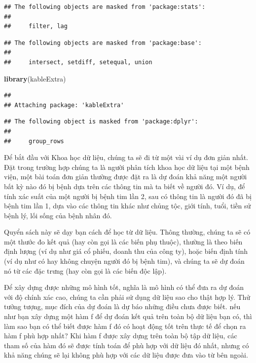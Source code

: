 \documentclass[
  12pt,
]{krantz}
\newenvironment{Shaded}{\begin{snugshade}}{\end{snugshade}}
\newcommand{\FunctionTok}[1]{\textcolor[rgb]{0.13,0.29,0.53}{\textbf{#1}}}
\newcommand{\NormalTok}[1]{#1}
\begin{document}
\begin{verbatim}
## The following objects are masked from 'package:stats':
## 
##     filter, lag
\end{verbatim}

\begin{verbatim}
## The following objects are masked from 'package:base':
## 
##     intersect, setdiff, setequal, union
\end{verbatim}

\begin{Shaded}
\begin{Highlighting}[]
\FunctionTok{library}\NormalTok{(kableExtra)}
\end{Highlighting}
\end{Shaded}

\begin{verbatim}
## 
## Attaching package: 'kableExtra'
\end{verbatim}

\begin{verbatim}
## The following object is masked from 'package:dplyr':
## 
##     group_rows
\end{verbatim}

Để bắt đầu với Khoa học dữ liệu, chúng ta sẽ đi từ một vài ví dụ đơn giản nhất. Đặt trong trường hợp chúng ta là người phân tích khoa học dữ liệu tại một bệnh viện, một bài toán đơn giản thường được đặt ra là dự đoán khả năng một người bất kỳ nào đó bị bệnh dựa trên các thông tin mà ta biết về người đó. Ví dụ, để tính xác suất của một người bị bệnh tim lần 2, sau có thông tin là người đó đã bị bệnh tim lần 1, dựa vào các thông tin khác như chủng tộc, giới tính, tuổi, tiền sử bệnh lý, lối sống của bệnh nhân đó.

Quyển sách này sẽ dạy bạn cách để học từ dữ liệu. Thông thường, chúng ta sẽ có một thước đo kết quả (hay còn gọi là các biến phụ thuộc), thường là theo biến định lượng (ví dụ như giá cổ phiếu, doanh thu của công ty), hoặc biến định tính (ví dụ như có hay không chuyện người đó bị bệnh tim), và chúng ta sẽ dự đoán nó từ các đặc trưng (hay còn gọi là các biến độc lập).

Để xây dựng được những mô hình tốt, nghĩa là mô hình có thể đưa ra dự đoán với độ chính xác cao, chúng ta cần phải sử dụng dữ liệu sao cho thật hợp lý. Thử tưởng tượng, mục đích của dự đoán là dự báo những điều chưa được biết. nếu như bạn xây dựng một hàm f để dự đoán kết quả trên toàn bộ dữ liệu bạn có, thì làm sao bạn có thể biết được hàm f đó có hoạt động tốt trên thực tế để chọn ra hàm f phù hợp nhất? Khi hàm f được xây dựng trên toàn bộ tập dữ liệu, các tham số của hàm đó sẽ được tính toán để phù hợp với dữ liệu đó nhất, nhưng có khả năng chúng sẽ lại không phù hợp với các dữ liệu được đưa vào từ bên ngoài.
\end{document}
